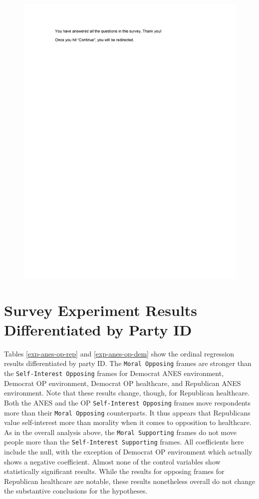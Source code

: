 \documentclass[12pt,econ]{sources/authesis}
\makeatletter
\def\maxwidth{\ifdim\Gin@nat@width>\linewidth\linewidth
\else\Gin@nat@width\fi}
\let\Oldincludegraphics\includegraphics
\renewcommand{\includegraphics}[1]{\Oldincludegraphics[width=\maxwidth]{#1}}
\makeatother
\begin{document}
\begin{figure}[hbt]
  \centering
\includegraphics{data/framing/appendix/questionnaire/questionnaire22.jpg}
\end{figure}
\clearpage

\hypertarget{app-framing-pid}{%
\section{Survey Experiment Results Differentiated by Party ID}\label{app-framing-pid}}

Tables \ref{exp-anes-op-rep} and \ref{exp-anes-op-dem} show the ordinal regression results differentiated by party ID. The \texttt{Moral\ Opposing} frames are stronger than the \texttt{Self-Interest\ Opposing} frames for Democrat ANES environment, Democrat OP environment, Democrat OP healthcare, and Republican ANES environment. Note that these results change, though, for Republican healthcare. Both the ANES and the OP \texttt{Self-Interest\ Opposing} frames move respondents more than their \texttt{Moral\ Opposing} counterparts. It thus appears that Republicans value self-interest more than morality when it comes to opposition to healthcare. As in the overall analysis above, the \texttt{Moral\ Supporting} frames do not move people more than the \texttt{Self-Interest\ Supporting} frames. All coefficients here include the null, with the exception of Democrat OP environment which actually shows a negative coefficient. Almost none of the control variables show statistically significant results. While the results for opposing frames for Republican healthcare are notable, these results nonetheless overall do not change the substantive conclusions for the hypotheses.
\end{document}

